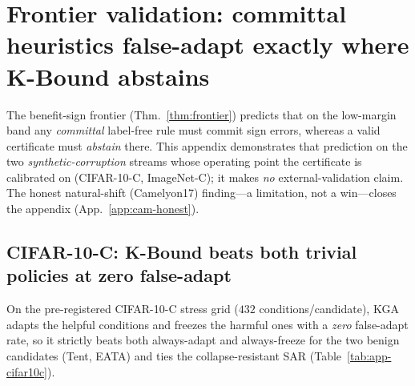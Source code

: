 \section{Frontier validation: committal heuristics false-adapt exactly where K-Bound abstains}
\label{app:frontier}

The benefit-sign frontier (Thm.~\ref{thm:frontier}) predicts that on the low-margin band any
\emph{committal} label-free rule must commit sign errors, whereas a valid certificate must
\emph{abstain} there. This appendix demonstrates that prediction on the two
\emph{synthetic-corruption} streams whose operating point the certificate is calibrated on
(CIFAR-10-C, ImageNet-C); it makes \emph{no} external-validation claim. The honest natural-shift
(Camelyon17) finding---a limitation, not a win---closes the appendix
(App.~\ref{app:cam-honest}).

\subsection{CIFAR-10-C: K-Bound beats both trivial policies at zero false-adapt}
\label{app:cifar10c}
On the pre-registered CIFAR-10-C stress grid ($432$ conditions/candidate), \textsc{KGA} adapts the
helpful conditions and freezes the harmful ones with a \emph{zero} false-adapt rate, so it strictly
beats both always-adapt and always-freeze for the two benign candidates (Tent, EATA) and ties the
collapse-resistant SAR (Table~\ref{tab:app-cifar10c}).

